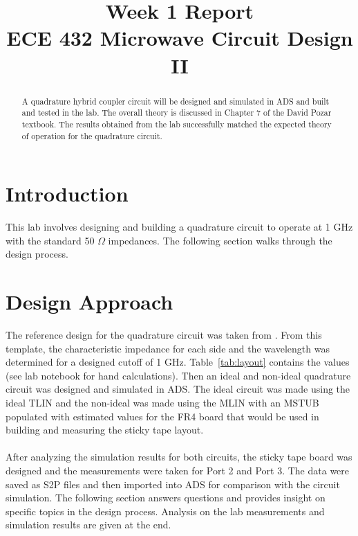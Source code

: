 \documentclass[conference]{IEEEtran}
\begin{document}
\title{Week 1 Report\\ECE 432 Microwave Circuit Design II}

\author{
}
\maketitle


\begin{abstract}
A quadrature hybrid coupler circuit will be designed and simulated in ADS and built and tested in the lab.  The overall theory is discussed in Chapter 7 of the David Pozar textbook.  The results obtained from the lab successfully matched the expected theory of operation for the quadrature circuit.
\end{abstract}
\IEEEpeerreviewmaketitle


\section{Introduction}
This lab involves designing and building a quadrature circuit to operate at 1 GHz with the standard 50 $\Omega$ impedances.  The following section walks through the design process.
\section{Design Approach}
The reference design for the quadrature circuit was taken from \cite{IEEEhowto:kopka}.  From this template, the characteristic impedance for each side and the wavelength was determined for a designed cutoff of 1 GHz.  Table~\ref{tab:layout} contains the values (see lab notebook for hand calculations).  Then an ideal and non-ideal quadrature circuit was designed and simulated in ADS.  The ideal circuit was made using the ideal TLIN and the non-ideal was made using the MLIN with an MSTUB populated with estimated values for the FR4 board that would be used in building and measuring the sticky tape layout.\\\\
After analyzing the simulation results for both circuits, the sticky tape board was designed and the measurements were taken for Port 2 and Port 3.  The data were saved as S2P files and then imported into ADS for comparison with the circuit simulation.  The following section answers questions and provides insight on specific topics in the design process.  Analysis on the lab measurements and simulation results are given at the end.
\end{document}
